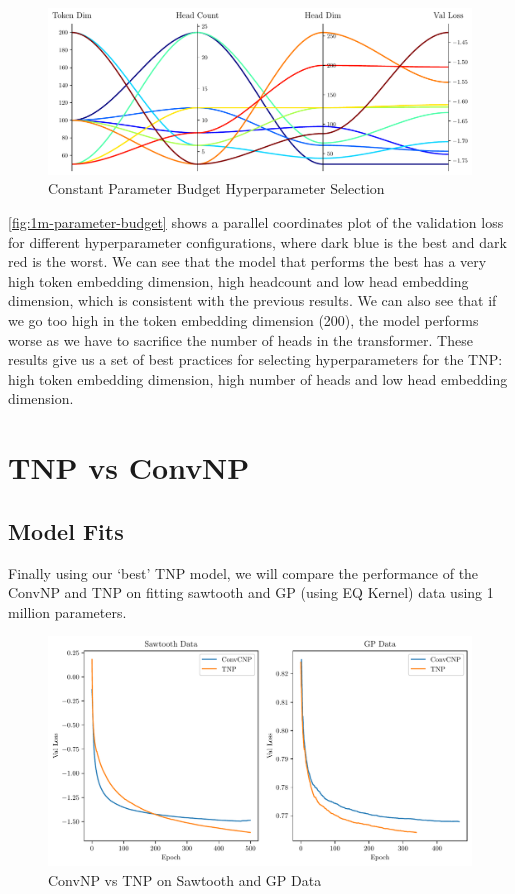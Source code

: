 \documentclass[../../main.tex]{subfiles}
\begin{document}

\FloatBarrier
\begin{figure}[ht!]
	\centering
	\includegraphics[width=0.9\linewidth]{./model-comparsion-1d.pdf}
	\caption{Constant Parameter Budget Hyperparameter Selection}
	\label{fig:1m-parameter-budget}
\end{figure}
\FloatBarrier

\autoref{fig:1m-parameter-budget} shows a parallel coordinates plot of the validation loss for different hyperparameter configurations, where dark blue is the best and dark red is the worst. We can see that the model that performs the best has a very high token embedding dimension, high headcount and low head embedding dimension, which is consistent with the previous results. We can also see that if we go too high in the token embedding dimension (200), the model performs worse as we have to sacrifice the number of heads in the transformer. These results give us a set of best practices for selecting hyperparameters for the TNP: high token embedding dimension, high number of heads and low head embedding dimension.





\section{TNP vs ConvNP}

\subsection{Model Fits}

Finally using our `best' TNP model, we will compare the performance of the ConvNP and TNP on fitting sawtooth and GP (using EQ Kernel) data using 1 million parameters. 


\begin{figure}[H]
	\centering
	\includegraphics[width=0.9\linewidth]{./convcnp-vs-tetnp-saw-gp.pdf}
	\caption{ConvNP vs TNP on Sawtooth and GP Data}
	\label{fig:conv-tnp-1d-result}
\end{figure}
\end{document}
